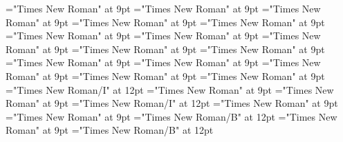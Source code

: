 \documentclass[gps1,twoside]{article}
\begin{document}
\font\reverseabbrvariantentrytypevariantentrytypesvariantformentrybackrefvariantformentrybackrefssubentrysubentriesentrybefore="Times New Roman" at 9pt
\font\spanreverseabbrvariantentrytypevariantentrytypesvariantformentrybackrefvariantformentrybackrefssubentrysubentriesentrylastchildafter="Times New Roman" at 9pt
\font\headwordvariantformentrybackrefvariantformentrybackrefssubentrysubentriesentrybefore="Times New Roman" at 9pt
\font\owningentrysummarydefinitionvariantformentrybackrefvariantformentrybackrefssubentrysubentriesentrybefore="Times New Roman" at 9pt
\font\spanowningentrysummarydefinitionvariantformentrybackrefvariantformentrybackrefssubentrysubentriesentrylastchildafter="Times New Roman" at 9pt
\font\etymologysubentrysubentriesentrybefore="Times New Roman" at 9pt
\font\etymologysubentrysubentriesentryafter="Times New Roman" at 9pt
\font\formetymologysubentrysubentriesentrybefore="Times New Roman" at 9pt
\font\spanformetymologysubentrysubentriesentrylastchildafter="Times New Roman" at 9pt
\font\glossetymologysubentrysubentriesentrybefore="Times New Roman" at 9pt
\font\spanglossetymologysubentrysubentriesentrylastchildafter="Times New Roman" at 9pt
\font\commentetymologysubentrysubentriesentrybefore="Times New Roman" at 9pt
\font\spancommentetymologysubentrysubentriesentrylastchildafter="Times New Roman" at 9pt
\font\minimallexreferencessubentrysubentriesentrybefore="Times New Roman" at 9pt
\font\minimallexreferencessubentrysubentriesentryafter="Times New Roman" at 9pt
\font\spanenownertypeabbreviationminimallexreferenceminimallexreferencessubentrysubentriesentry="Times New Roman/I" at 12pt
\font\ownertypeabbreviationminimallexreferenceminimallexreferencessubentrysubentriesentrybefore="Times New Roman" at 9pt
\font\spanownertypeabbreviationminimallexreferenceminimallexreferencessubentrysubentriesentrylastchildafter="Times New Roman" at 9pt
\font\spanownertypeabbreviationminimallexreferenceminimallexreferencessubentrysubentriesentry="Times New Roman/I" at 12pt
\font\configtargetconfigtargetconfigtargetsminimallexreferenceminimallexreferencessubentrysubentriesentrybefore="Times New Roman" at 9pt
\font\configtargetsminimallexreferenceminimallexreferencessubentrysubentriesentryafter="Times New Roman" at 9pt
\font\spanbzhheadwordconfigtargetconfigtargetsminimallexreferenceminimallexreferencessubentrysubentriesentry="Times New Roman/B" at 12pt
\font\headwordconfigtargetconfigtargetsminimallexreferenceminimallexreferencessubentrysubentriesentrybefore="Times New Roman" at 9pt
\font\spanheadwordconfigtargetconfigtargetsminimallexreferenceminimallexreferencessubentrysubentriesentry="Times New Roman/B" at 12pt
\end{document}
